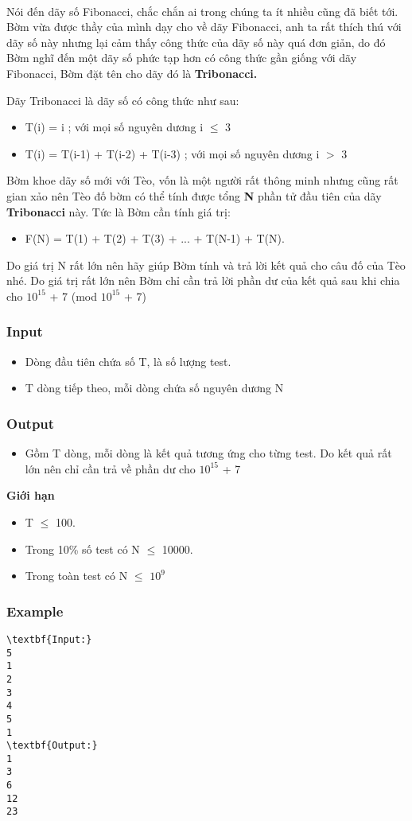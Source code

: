 

 

Nói đến dãy số Fibonacci, chắc chắn ai trong chúng ta ít nhiều cũng đã biết tới. Bờm vừa được thầy của mình dạy cho về dãy Fibonacci, anh ta rất thích thú với dãy số này nhưng lại cảm thấy công thức của dãy số này quá đơn giản, do đó Bờm nghĩ đến một dãy số phức tạp hơn có công thức gần giống với dãy Fibonacci, Bờm đặt tên cho dãy đó là \textbf{ Tribonacci. }

Dãy Tribonacci là dãy số có công thức như sau:
\begin{itemize}
	\item T(i) = i ; với mọi số nguyên dương i  $\le$  3
	\item T(i) = T(i-1) + T(i-2) + T(i-3) ; với mọi số nguyên dương i $>$ 3
\end{itemize}

Bờm khoe dãy số mới với Tèo, vốn là một người rất thông minh nhưng cũng rất gian xảo nên Tèo đố bờm có thể tính được tổng \textbf{ N } phần tử đầu tiên của dãy \textbf{ Tribonacci } này. Tức là Bờm cần tính giá trị:
\begin{itemize}
	\item F(N) = T(1) + T(2) + T(3) + ... + T(N-1) + T(N).
\end{itemize}

Do giá trị N rất lớn nên hãy giúp Bờm tính và trả lời kết quả cho câu đố của Tèo nhé. Do giá trị rất lớn nên Bờm chỉ cần trả lời phần dư của kết quả sau khi chia cho $10^{15}$ + 7 (mod $10^{15}$ + 7)

\subsubsection{Input}
\begin{itemize}
	\item Dòng đầu tiên chứa số T, là số lượng test.
	\item T dòng tiếp theo, mỗi dòng chứa số nguyên dương N
\end{itemize}

\subsubsection{Output}
\begin{itemize}
	\item Gồm T dòng, mỗi dòng là kết quả tương ứng cho từng test. Do kết quả rất lớn nên chỉ cần trả về phần dư cho $10^{15}$ + 7
\end{itemize}

\textbf{Giới hạn }
\begin{itemize}
	\item T  $\le$  100.
	\item Trong 10\% số test có N  $\le$  10000.
	\item Trong toàn test có N  $\le$  $10^{9}$
\end{itemize}

\subsubsection{Example}
\begin{verbatim}
\textbf{Input:}
5
1
2
3
4
5
1
\textbf{Output:}
1
3
6
12
23
\end{verbatim}

